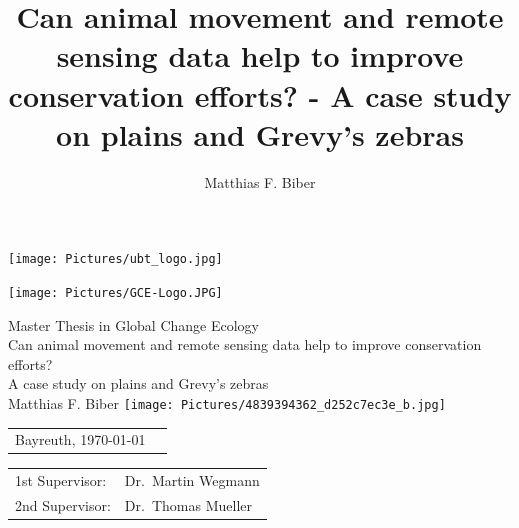\documentclass[12pt,a4paper, twoside, english]{article}
\title{Can animal movement and remote sensing data help to improve conservation efforts? - A case study on plains and Grevy's zebras}
\author{Matthias F. Biber}
\begin{document}
\begin{titlepage}
\setlength{\parindent}{0pt}
\vspace{1.5em}

\begin{minipage}[c]{0.49\textwidth} 
\texttt{[image: Pictures/ubt\_logo.jpg]}
\end{minipage} \hfill
\begin{minipage}[c]{0.49\textwidth}
\flushright
\texttt{[image: Pictures/GCE-Logo.JPG]}
\end{minipage}
\vfill

\begin{center}
{\Large Master Thesis in Global Change Ecology}\\[1cm]
\doublespacing
{\Huge Can animal movement and remote sensing data help to improve conservation efforts?} \\ [1ex]
{\Large A case study on plains and Grevy's zebras} \\ [2ex]
{\Large Matthias F. Biber}
\vfill
\texttt{[image: Pictures/4839394362\_d252c7ec3e\_b.jpg]}
\end{center}
\vfill

\begin{tabular}{ll}
Bayreuth, \today \par \\[1cm]
\end{tabular}

\begin{tabular}{ll}
1st Supervisor: & Dr.\ Martin Wegmann \\
2nd Supervisor: & Dr.\ Thomas Mueller \\
\end{tabular}
\end{titlepage}
\end{document}
